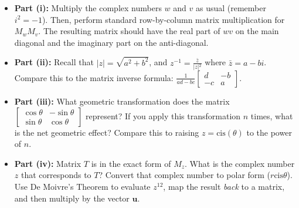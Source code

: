 \begin{hint}
\begin{itemize}
    \item \textbf{Part (i):} Multiply the complex numbers $w$ and $v$ as usual (remember $i^2 = -1$). Then, perform standard row-by-column matrix multiplication for $M_w M_v$. The resulting matrix should have the real part of $wv$ on the main diagonal and the imaginary part on the anti-diagonal.
    \item \textbf{Part (ii):} Recall that $\vert{}z\vert{} = \sqrt{a^2 + b^2}$, and $z^{-1} = \frac{\bar{z}}{\vert{}z\vert{}^2}$ where $\bar{z} = a - bi$. Compare this to the matrix inverse formula: $\frac{1}{ad-bc}\begin{bmatrix} d & -b \\ -c & a \end{bmatrix}$. 
    \item \textbf{Part (iii):} What geometric transformation does the matrix $\begin{bmatrix} \cos\theta & -\sin\theta \\ \sin\theta & \cos\theta \end{bmatrix}$ represent? If you apply this transformation $n$ times, what is the net geometric effect? Compare this to raising $z = \text{cis}(\theta)$ to the power of $n$.
    \item \textbf{Part (iv):} Matrix $T$ is in the exact form of $M_z$. What is the complex number $z$ that corresponds to $T$? Convert that complex number to polar form ($r\text{cis}\theta$). Use De Moivre's Theorem to evaluate $z^{12}$, map the result \textit{back} to a matrix, and then multiply by the vector $\mathbf{u}$.
\end{itemize}
\end{hint}

